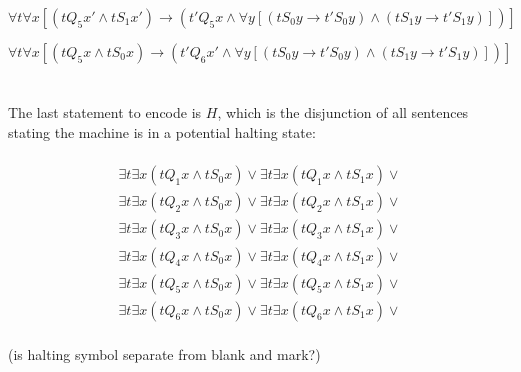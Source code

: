\documentclass[a4paper,11pt]{article}
\begin{document}
\begin{equation}
\forall t \forall x [(tQ_{5}x' \land tS_{1}x') \rightarrow (t'Q_{5}x \land \forall y [(tS_{0}y \rightarrow t'S_{0}y)
\land (tS_{1}y \rightarrow t'S_{1}y)])]
\end{equation}

\begin{equation}
\forall t \forall x [(tQ_{5}x \land tS_{0}x) \rightarrow (t'Q_{6}x' \land \forall y [(tS_{0}y \rightarrow t'S_{0}y) 
\land (tS_{1}y \rightarrow t'S_{1}y)])]
\end{equation}
\\\\
The last statement to encode is $H$, which is the disjunction of all sentences stating the machine is in a 
potential halting state:

\begin{multline}
\\ \exists t \exists x (tQ_{1}x \land tS_{0}x) \lor \exists t \exists x (tQ_{1}x \land tS_{1}x) \lor \\
\exists t \exists x (tQ_{2}x \land tS_{0}x) \lor \exists t \exists x (tQ_{2}x \land tS_{1}x) \lor \\
\exists t \exists x (tQ_{3}x \land tS_{0}x) \lor \exists t \exists x (tQ_{3}x \land tS_{1}x) \lor \\
\exists t \exists x (tQ_{4}x \land tS_{0}x) \lor \exists t \exists x (tQ_{4}x \land tS_{1}x) \lor \\
\exists t \exists x (tQ_{5}x \land tS_{0}x) \lor \exists t \exists x (tQ_{5}x \land tS_{1}x) \lor \\
\exists t \exists x (tQ_{6}x \land tS_{0}x) \lor \exists t \exists x (tQ_{6}x \land tS_{1}x) \lor \\
\end{multline}

(is halting symbol separate from blank and mark?)
\end{document}
